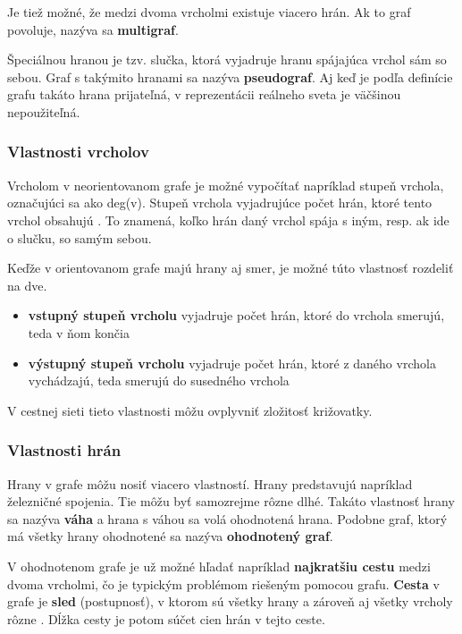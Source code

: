 \documentclass[12pt,twoside,slovak,a4paper]{article}
\begin{document}
Je tiež možné, že medzi dvoma vrcholmi existuje viacero hrán. Ak to graf povoluje, nazýva sa \textbf{multigraf}.

Špeciálnou hranou je tzv. slučka, ktorá vyjadruje hranu spájajúca vrchol sám so sebou. Graf s takýmito hranami sa nazýva \textbf{pseudograf}. Aj keď je podľa definície grafu takáto hrana prijateľná, v reprezentácii reálneho sveta je väčšinou nepoužiteľná.

\subsubsection{Vlastnosti vrcholov}
Vrcholom v neorientovanom grafe je možné vypočítať napríklad stupeň vrchola, označujúci sa ako deg(v). Stupeň vrchola vyjadrujúce počet hrán, ktoré tento vrchol obsahujú \cite{KzDM}.  To znamená, koľko hrán daný vrchol spája s iným, resp. ak ide o slučku, so samým sebou.

Keďže v orientovanom grafe majú hrany aj smer, je možné túto vlastnosť rozdeliť na dve. 
\begin{itemize}
\item \textbf{vstupný stupeň vrcholu} vyjadruje počet hrán, ktoré do vrchola smerujú, teda v ňom končia
\item \textbf{výstupný stupeň vrcholu} vyjadruje počet hrán, ktoré z daného vrchola vychádzajú, teda smerujú do susedného vrchola
\end{itemize}

V cestnej sieti tieto vlastnosti môžu ovplyvniť zložitosť križovatky.

\subsubsection{Vlastnosti hrán}
Hrany v grafe môžu nosiť viacero vlastností. Hrany predstavujú napríklad železničné spojenia. Tie môžu byť samozrejme rôzne dlhé. Takáto vlastnosť hrany sa nazýva \textbf{váha} a hrana s váhou sa volá ohodnotená hrana. Podobne graf, ktorý má všetky hrany ohodnotené sa nazýva  \textbf{ohodnotený graf}.

V ohodnotenom grafe je už možné hľadať napríklad \textbf{najkratšiu cestu} medzi dvoma vrcholmi, čo je typickým problémom riešeným pomocou grafu.
\textbf{Cesta} v grafe je \textbf{sled} (postupnosť), v ktorom sú všetky hrany a zároveň aj všetky vrcholy rôzne \cite{ADM}. Dĺžka cesty je potom súčet cien hrán v tejto ceste.
\end{document}
